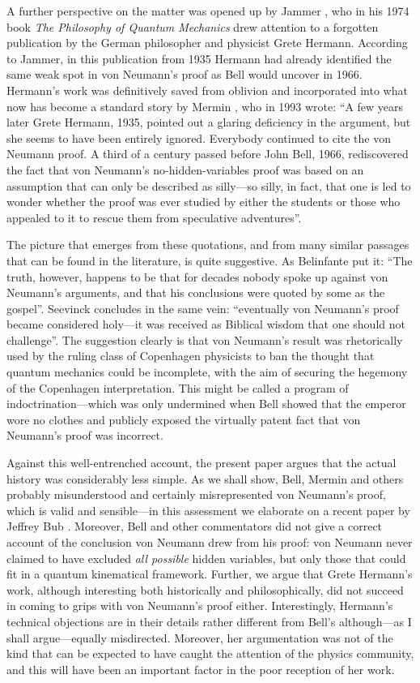 \documentclass[12pt]{article}
\begin{document}
A further perspective on the matter was opened up by Jammer \cite{jammer}, who in his 1974 book \emph{The Philosophy of Quantum Mechanics} drew attention to a forgotten publication by the German philosopher and physicist Grete Hermann. According to Jammer, in this publication from 1935 Hermann had already identified the same weak spot in von Neumann's proof as Bell would uncover in 1966. Hermann's work was definitively saved from oblivion and incorporated into what now has become a standard story by Mermin \cite{mermin}, who in 1993 wrote: ``A few years later Grete Hermann, 1935, pointed out a glaring deficiency in the argument, but she seems to have been entirely ignored. Everybody continued to cite the von Neumann proof. A third of a century passed before John Bell, 1966, rediscovered the fact that von Neumann's no-hidden-variables proof was based on an assumption that can only be described as silly---so silly, in fact, that one is led to wonder whether the proof was ever studied by either the students or those who appealed to it to rescue them from speculative adventures''.

The picture that emerges from these quotations, and from many similar passages that can be found in the literature, is quite suggestive. As Belinfante \cite {belinfante} put it: ``The truth, however, happens to be that for decades nobody spoke up against von Neumann's arguments, and that his conclusions were quoted by some as the gospel''. Seevinck \cite{seevinck} concludes in the same vein: ``eventually von Neumann's proof became considered holy---it was received as Biblical wisdom that one should not challenge''.  The suggestion clearly is that von Neumann's result was rhetorically used by the ruling class of Copenhagen physicists to ban the thought that quantum mechanics could be incomplete, with the aim of securing the hegemony of the Copenhagen interpretation. This might be called a program of indoctrination---which was only undermined when Bell showed that the emperor wore no clothes and publicly exposed the virtually patent fact that von Neumann's proof was incorrect.

Against this well-entrenched account, the present paper argues that the actual history was considerably less simple. As we shall show, Bell, Mermin and others probably misunderstood and certainly misrepresented von Neumann's proof, which is valid and sensible---in this assessment we elaborate on a recent paper by Jeffrey Bub \cite{bub}. Moreover, Bell and other commentators did not give a correct account of the conclusion von Neumann drew from his proof: von Neumann never claimed to have excluded \emph{all possible} hidden variables, but only those that could fit in a quantum kinematical framework. Further, we argue that Grete Hermann's work, although interesting both historically and philosophically, did not succeed in coming to grips with von Neumann's proof either. Interestingly, Hermann's technical objections are in their details rather different from Bell's although---as I shall argue---equally misdirected. Moreover, her argumentation was not of the kind that can be expected to have caught the attention of the physics community, and this will have been an important factor in the poor reception of her work.
\end{document}
